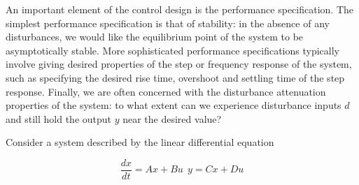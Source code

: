 An important element of the control design is the performance specification.
The simplest performance specification is that of stability: in the absence of any
disturbances, we would like the equilibrium point of the system to be asymptotically
stable. More sophisticated performance specifications typically involve giving desired properties of the step or frequency response of the system, such as specifying the desired rise time, overshoot and settling time of the step response. Finally, we are often concerned with the disturbance attenuation properties of the system: to
what extent can we experience disturbance inputs $d$ and still hold the output $y$ near the desired value?

Consider a system described by the linear differential equation



\begin{equation}
\frac{dx}{dt} = Ax + Bu ~~ y = Cx + Du
\end{equation}






